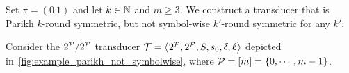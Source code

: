 \begin{example}
\label{example:parikh_not_symbolwise}
Set $\pi=(0\ 1)$ and let $k\in \mathbb{N}$ and $m\geq 3$. We construct a transducer that is Parikh $k$-round symmetric, but not symbol-wise $k'$-round symmetric for any $k'$.

Consider the $2^{\mathcal{P}}/2^{\mathcal{P}}$ transducer $\mathcal{T}=\left< 2^{\mathcal{P}},2^{\mathcal{P}},S,s_0,\delta,\boldsymbol{\ell}\right>$ depicted in~\cref{fig:example_parikh_not_symbolwise}, where $\mathcal{P}=[m]=\{0,\cdots, m-1\}$.


\end{example}
